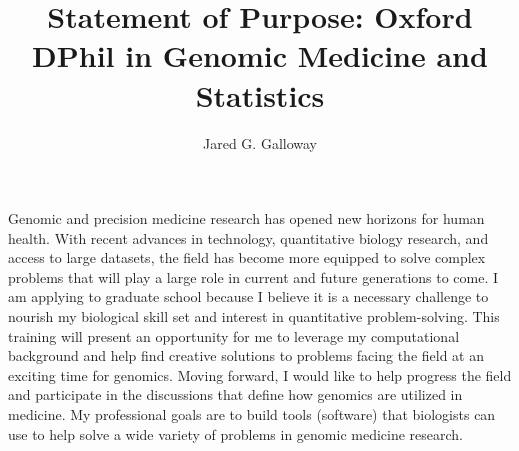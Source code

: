 \documentclass[10pt]{amsart}
\title{Statement of Purpose: Oxford DPhil in Genomic Medicine and Statistics}
\author{Jared G. Galloway}
\newcommand{\sepspace}{\vspace*{1em}}		%
\begin{document}
\maketitle


Genomic and precision medicine research has opened new horizons for human health.
With recent advances in technology, quantitative biology research, and access to large datasets, 
the field has become more equipped to solve complex problems that will play a large role in current and future generations to come.
I am applying to graduate school because I believe it is a necessary challenge to nourish my biological skill set and interest in quantitative problem-solving. 
This training will present an opportunity for me to leverage my computational background and help find creative solutions to problems facing the field at an exciting time for genomics.
Moving forward, I would like to help progress the field and participate in the discussions that define how genomics are utilized in medicine.
My professional goals are to build tools (software) that biologists can use to help solve a wide variety of problems in genomic medicine research.
\sepspace
\end{document}
